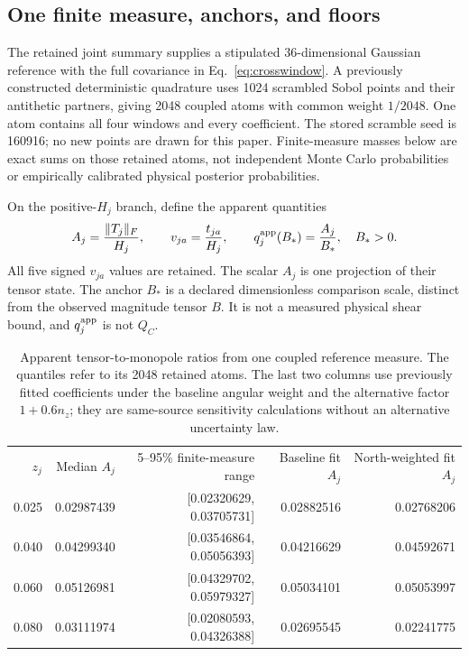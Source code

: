 \subsection{One finite measure, anchors, and floors}

The retained joint summary supplies a stipulated 36-dimensional Gaussian reference with the full covariance in Eq.~\eqref{eq:crosswindow}. A previously constructed deterministic quadrature uses 1024 scrambled Sobol points and their antithetic partners, giving 2048 coupled atoms with common weight $1/2048$. One atom contains all four windows and every coefficient. The stored scramble seed is 160916; no new points are drawn for this paper. Finite-measure masses below are exact sums on those retained atoms, not independent Monte Carlo probabilities or empirically calibrated physical posterior probabilities.

On the positive-$H_j$ branch, define the apparent quantities
\begin{equation}
 A_j=\frac{\|T_j\|_F}{H_j},\qquad
 v_{ja}=\frac{t_{ja}}{H_j},\qquad
 q^{\rm app}_j(B_*)=\frac{A_j}{B_*},\quad B_*>0.
 \label{eq:apparent}
\end{equation}
All five signed $v_{ja}$ values are retained. The scalar $A_j$ is one projection of their tensor state. The anchor $B_*$ is a declared dimensionless comparison scale, distinct from the observed magnitude tensor $B$. It is not a measured physical shear bound, and $q_j^{\rm app}$ is not $Q_C$.

\begin{table}[htb]
\caption{Apparent tensor-to-monopole ratios from one coupled reference measure. The quantiles refer to its 2048 retained atoms. The last two columns use previously fitted coefficients under the baseline angular weight and the alternative factor $1+0.6n_z$; they are same-source sensitivity calculations without an alternative uncertainty law.}
\label{tab:apparent}
\begin{ruledtabular}
\begin{tabular}{rrrrr}
$z_j$&Median $A_j$&5--95\% finite-measure range&Baseline fit $A_j$&North-weighted fit $A_j$\\
0.025&0.02987439&[0.02320629, 0.03705731]&0.02882516&0.02768206\\
0.040&0.04299340&[0.03546864, 0.05056393]&0.04216629&0.04592671\\
0.060&0.05126981&[0.04329702, 0.05979327]&0.05034101&0.05053997\\
0.080&0.03111974&[0.02080593, 0.04326388]&0.02695545&0.02241775
\end{tabular}
\end{ruledtabular}
\end{table}

